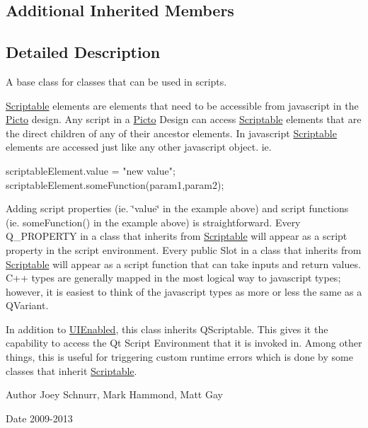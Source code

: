 \subsection*{Additional Inherited Members}


\subsection{Detailed Description}
A base class for classes that can be used in scripts. 

\hyperlink{class_picto_1_1_scriptable}{Scriptable} elements are elements that need to be accessible from javascript in the \hyperlink{namespace_picto}{Picto} design. Any script in a \hyperlink{namespace_picto}{Picto} Design can access \hyperlink{class_picto_1_1_scriptable}{Scriptable} elements that are the direct children of any of their ancestor elements. In javascript \hyperlink{class_picto_1_1_scriptable}{Scriptable} elements are accessed just like any other javascript object. ie. 
\begin{DoxyCode}
scriptableElement.value = \textcolor{stringliteral}{"new value"};
scriptableElement.someFunction(param1,param2);
\end{DoxyCode}


Adding script properties (ie. \char`\"{}value\char`\"{} in the example above) and script functions (ie. some\-Function() in the example above) is straightforward. Every Q\-\_\-\-P\-R\-O\-P\-E\-R\-T\-Y in a class that inherits from \hyperlink{class_picto_1_1_scriptable}{Scriptable} will appear as a script property in the script environment. Every public Slot in a class that inherits from \hyperlink{class_picto_1_1_scriptable}{Scriptable} will appear as a script function that can take inputs and return values. C++ types are generally mapped in the most logical way to javascript types; however, it is easiest to think of the javascript types as more or less the same as a Q\-Variant.

In addition to \hyperlink{class_picto_1_1_u_i_enabled}{U\-I\-Enabled}, this class inherits Q\-Scriptable. This gives it the capability to access the Qt Script Environment that it is invoked in. Among other things, this is useful for triggering custom runtime errors which is done by some classes that inherit \hyperlink{class_picto_1_1_scriptable}{Scriptable}. \begin{DoxyAuthor}{Author}
Joey Schnurr, Mark Hammond, Matt Gay 
\end{DoxyAuthor}
\begin{DoxyDate}{Date}
2009-\/2013 
\end{DoxyDate}



